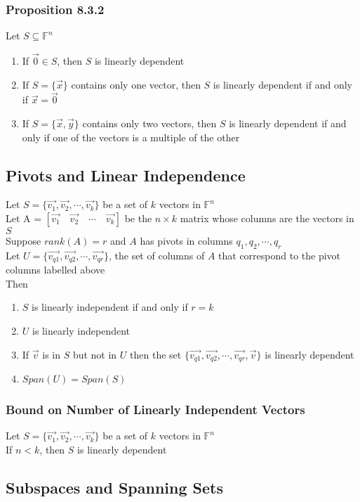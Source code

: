 \documentclass[12pt, letterpaper]{article}
\begin{document}
\subsubsection{Proposition 8.3.2}
Let $S\subseteq\mathbb{F}^n$
\begin{enumerate}
    \item If $\vec{0}\in S$, then $S$ is linearly dependent 
    \item If $S=\{\vec{x}\}$ contains only one vector, then $S$ is linearly dependent if and only if $\vec{x} = \vec{0}$
    \item If $S=\{\vec{x},\vec{y}\}$ contains only two vectors, then $S$ is linearly dependent if and only if one of the vectors is a multiple of the other 
\end{enumerate}
\subsection{Pivots and Linear Independence}
Let $S=\{\vec{v_1}, \vec{v_2}, \cdots, \vec{v_k}\}$ be a set of $k$ vectors in $\mathbb{F}^n$ \\
Let A = $[\vec{v_1}\quad \vec{v_2}\quad \cdots\quad \vec{v_k}]$ be the $n\times k$ matrix whose columns are the vectors in $S$ \\
Suppose $rank(A) = r$ and $A$ has pivots in columns $q_1, q_2, \cdots, q_r$ \\
Let $U=\{\vec{v_{q1}}, \vec{v_{q2}}, \cdots, \vec{v_{qr}}\}$, the set of columns of $A$ that correspond to the pivot columns labelled above \\
Then 
\begin{enumerate}
    \item $S$ is linearly independent if and only if $r=k$
    \item $U$ is linearly independent 
    \item If $\vec{v}$ is in $S$ but not in $U$ then the set $\{\vec{v_{q1}}, \vec{v_{q2}}, \cdots, \vec{v_{qr}}, \vec{v}\}$ is linearly dependent 
    \item $Span(U) = Span(S)$
\end{enumerate}
\subsubsection{Bound on Number of Linearly Independent Vectors}
Let $S=\{\vec{v_1}, \vec{v_2}, \cdots, \vec{v_k}\}$ be a set of $k$ vectors in $\mathbb{F}^n$ \\
If $n<k$, then $S$ is linearly dependent
\subsection{Subspaces and Spanning Sets}
\end{document}
